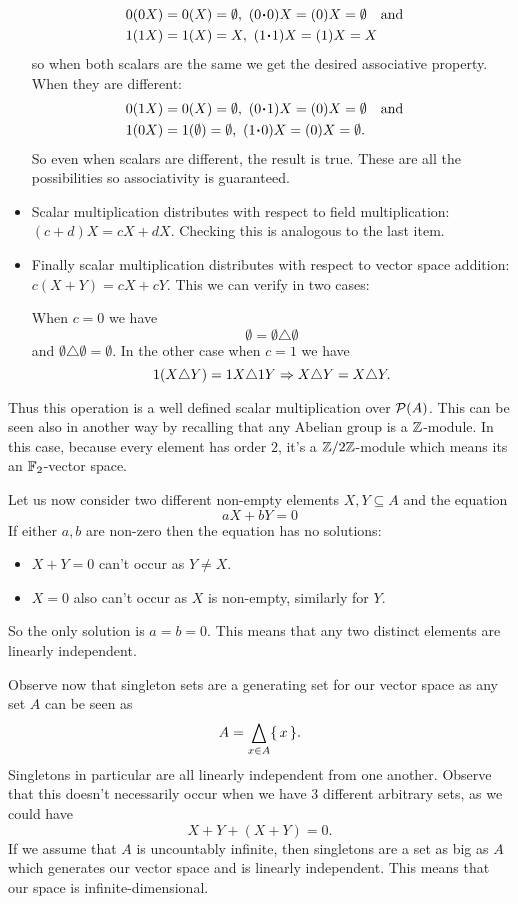 \documentclass[12pt]{memoir}
\begin{document}
\begin{ptcbr}
\begin{itemize}
    \begin{align*}
        &0(0X)=0(X)=\emptyset,\ (0\.0)X=(0)X=\emptyset\word{and}\\
        &1(1X)=1(X)=X,\ (1\.1)X=(1)X=X    
    \end{align*}
    so when both scalars are the same we get the desired associative property. When they are different:
    \begin{align*}
        &0(1X)=0(X)=\emptyset,\ (0\.1)X=(0)X=\emptyset\word{and}\\
        &1(0X)=1(\emptyset)=\emptyset,\ (1\.0)X=(0)X=\emptyset.    
    \end{align*}
    So even when scalars are different, the result is true. These are all the possibilities so associativity is guaranteed.
    \item Scalar multiplication distributes with respect to field multiplication: $(c+d)X=cX+dX$. Checking this is analogous to the last item.
    \item Finally scalar multiplication distributes with respect to vector space addition: $c(X+Y)=cX+cY$. This we can verify in two cases:\par 
    When $c=0$ we have 
    $$\emptyset=\emptyset\triangle\emptyset$$ 
    and $\emptyset\triangle\emptyset=\emptyset$.
    In the other case when $c=1$ we have 
    $$1(X\triangle Y)=1X\triangle1Y\Rightarrow X\triangle Y=X\triangle Y.$$
\end{itemize}
Thus this operation is a well defined scalar multiplication over $\mathcal{P}(A)$. This can be seen also in another way by recalling that any Abelian group is a $\mathbb{Z}$-module. In this case, because every element has order $2$, it's a $\mathbb{Z}/2\mathbb{Z}$-module which means its an $\mathbb{F}_2$-vector space.\par
Let us now consider two different non-empty elements $X,Y\subseteq A$ and the equation 
$$aX+bY=0$$
If either $a,b$ are non-zero then the equation has no solutions:
\begin{itemize}
    \item $X+Y=0$ can't occur as $Y\neq X$.
    \item $X=0$ also can't occur as $X$ is non-empty, similarly for $Y$.
\end{itemize}
So the only solution is $a=b=0$. This means that any two distinct elements are linearly independent.\par 
Observe now that singleton sets are a generating set for our vector space as any set $A$ can be seen as 
$$A=\bigtriangleup_{x\in A}\{\,x\,\}.$$
Singletons in particular are all linearly independent from one another. Observe that this doesn't necessarily occur when we have $3$ different arbitrary sets, as we could have 
$$X+Y+(X+Y)=0.$$
If we assume that $A$ is uncountably infinite, then singletons are a set as big as $A$ which generates our vector space and is linearly independent. This means that our space is infinite-dimensional.
\end{ptcbr}
\end{document}
